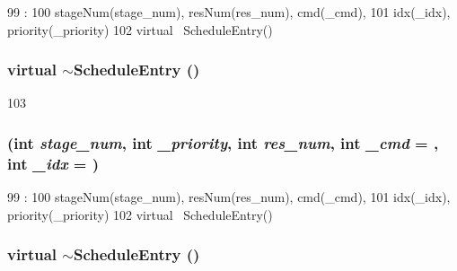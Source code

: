 \begin{DoxyCode}
99                                     :
100             stageNum(stage_num), resNum(res_num), cmd(_cmd),
101             idx(_idx), priority(_priority)
102         { }
        virtual ~ScheduleEntry(){}
\end{DoxyCode}
\hypertarget{structThePipeline_1_1ScheduleEntry_af29b983aaf5026d418a9e6a126388bb1}{
\subsubsection[{$\sim$ScheduleEntry}]{\setlength{\rightskip}{0pt plus 5cm}virtual $\sim${\bf ScheduleEntry} ()}}
\label{structThePipeline_1_1ScheduleEntry_af29b983aaf5026d418a9e6a126388bb1}



\begin{DoxyCode}
103 {}
\end{DoxyCode}
\hypertarget{structThePipeline_1_1ScheduleEntry_a39f5765d7267f4eed1690e3c3476d2ef}{
\subsubsection[{ScheduleEntry}]{ (int {\em stage\_\-num}, \/  int {\em \_\-priority}, \/  int {\em res\_\-num}, \/  int {\em \_\-cmd} = {}, \/  int {\em \_\-idx} = {})}}
\label{structThePipeline_1_1ScheduleEntry_a39f5765d7267f4eed1690e3c3476d2ef}



\begin{DoxyCode}
99                                     :
100             stageNum(stage_num), resNum(res_num), cmd(_cmd),
101             idx(_idx), priority(_priority)
102         { }
        virtual ~ScheduleEntry(){}
\end{DoxyCode}
\hypertarget{structThePipeline_1_1ScheduleEntry_af29b983aaf5026d418a9e6a126388bb1}{
\subsubsection[{$\sim$ScheduleEntry}]{\setlength{\rightskip}{0pt plus 5cm}virtual $\sim${\bf ScheduleEntry} ()}}
\label{structThePipeline_1_1ScheduleEntry_af29b983aaf5026d418a9e6a126388bb1}




